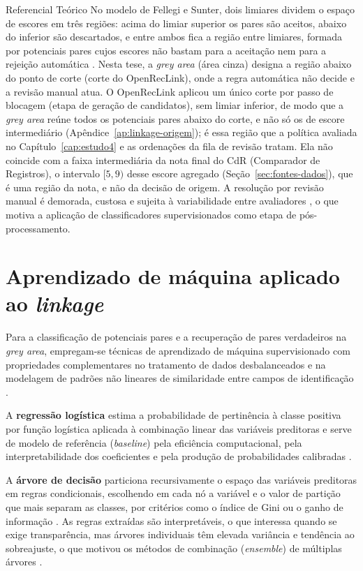 \begin{chapter}{Referencial Teórico}
\label{sec:area-cinza}No modelo de Fellegi e Sunter, dois limiares dividem o espaço de escores em três regiões: acima do limiar superior os pares são aceitos, abaixo do inferior são descartados, e entre ambos fica a região entre limiares, formada por potenciais pares cujos escores não bastam para a aceitação nem para a rejeição automática \cite{Fellegi1969theory, Christen2012book}. Nesta tese, a \textit{grey area} (área cinza) designa a região abaixo do ponto de corte (corte do OpenRecLink), onde a regra automática não decide e a revisão manual atua. O OpenRecLink aplicou um único corte por passo de blocagem (etapa de geração de candidatos), sem limiar inferior, de modo que a \textit{grey area} reúne todos os potenciais pares abaixo do corte, e não só os de escore intermediário (Apêndice~\ref{ap:linkage-origem}); é essa região que a política avaliada no Capítulo~\ref{cap:estudo4} e as ordenações da fila de revisão tratam. Ela não coincide com a faixa intermediária da nota final do CdR (Comparador de Registros), o intervalo $[5,9)$ desse escore agregado (Seção~\ref{sec:fontes-dados}), que é uma região da nota, e não da decisão de origem. A resolução por revisão manual é demorada, custosa e sujeita à variabilidade entre avaliadores \cite{Christen2012book}, o que motiva a aplicação de classificadores supervisionados como etapa de pós-processamento.


\section{Aprendizado de máquina aplicado ao \textit{linkage}}\label{sec:tecnicas-ml}

Para a classificação de potenciais pares e a recuperação de pares verdadeiros na \textit{grey area}, empregam-se técnicas de aprendizado de máquina supervisionado com propriedades complementares no tratamento de dados desbalanceados e na modelagem de padrões não lineares de similaridade entre campos de identificação \cite{Hastie2009elements}.

A \textbf{regressão logística} estima a probabilidade de pertinência à classe positiva por função logística aplicada à combinação linear das variáveis preditoras e serve de modelo de referência (\textit{baseline}) pela eficiência computacional, pela interpretabilidade dos coeficientes e pela produção de probabilidades calibradas \cite{Hastie2009elements}.

A \textbf{árvore de decisão} particiona recursivamente o espaço das variáveis preditoras em regras condicionais, escolhendo em cada nó a variável e o valor de partição que mais separam as classes, por critérios como o índice de Gini ou o ganho de informação \cite{Breiman1984cart, Hastie2009elements}. As regras extraídas são interpretáveis, o que interessa quando se exige transparência, mas árvores individuais têm elevada variância e tendência ao sobreajuste, o que motivou os métodos de combinação (\textit{ensemble}) de múltiplas árvores \cite{Breiman2001rf}.


\end{chapter}
